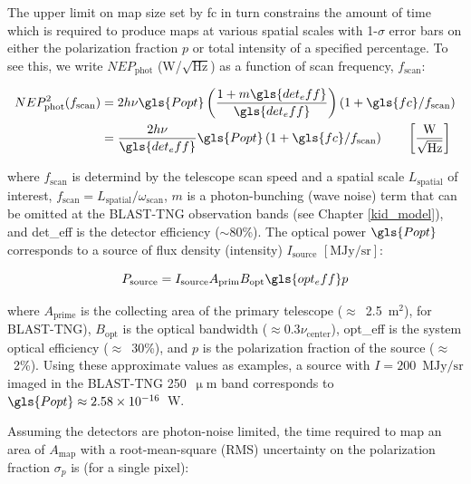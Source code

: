 The upper limit on map size set by \gls{fc} in turn constrains the amount of time which is required to produce maps at various spatial scales with 1-$\sigma$ error bars on either the polarization fraction $p$ or total intensity of a specified percentage. To see this, we write $NEP_{\mathrm{phot}}$ (W/$\sqrt{\mathrm{Hz}}$) as a function of scan frequency, $f_{\mathrm{scan}}$:

\begin{equation}\label{eq:nep flicker}
  \begin{aligned}
  NEP_{\mathrm{phot}}^{2}(f_{\mathrm{scan}}) &= 2 h \nu \gls{Popt} \left( \frac{1 + m \gls{det_eff}}{\gls{det_eff}}\right) \left(1 + \gls{fc}/f_{\mathrm{scan}} \right) \\
          &= \frac{2 h \nu}{ \gls{det_eff} } \gls{Popt} \left( 1 + \gls{fc}/f_{\mathrm{scan}} \right) \qquad \left[ \frac{ \mathrm{W} }{ \sqrt{\mathrm{Hz}} } \right]
  \end{aligned}
\end{equation}

where $f_{\mathrm{scan}}$ is determind by the telescope scan speed and a spatial scale $L_{\mathrm{spatial}}$ of interest, $f_{\mathrm{scan}} = L_{\mathrm{spatial}} / \omega_{\mathrm{scan}}$, $m$ is a photon-bunching (wave noise) term that can be omitted at the BLAST-TNG observation bands (see Chapter \ref{kid_model}), and \gls{det_eff} is the detector efficiency ($\sim$80\%). The optical power $\gls{Popt}$ corresponds to a source of flux density (intensity) $I_{\mathrm{source}}$ $[\mathrm{MJy}/\mathrm{sr}]$:

\begin{equation}
  P_{\mathrm{source}} = I_{\mathrm{source}} A_{\mathrm{prim}} B_{\mathrm{opt}} \gls{opt_eff} p
\end{equation}

where $A_{\mathrm{prime}}$ is the collecting area of the primary telescope ($\approx$~2.5~m$^{2}$), for BLAST-TNG), $B_{\mathrm{opt}}$ is the optical bandwidth ($\approx 0.3 \nu_{\mathrm{center}}$), \gls{opt_eff} is the system optical efficiency ($\approx$~30\%), and $p$ is the polarization fraction of the source ($\approx$~2\%). Using these approximate values as examples, a source with $I = 200$~$\mathrm{MJy}/\mathrm{sr}$ imaged in the BLAST-TNG 250~$\upmu$m band corresponds to $\gls{Popt} \approx 2.58 \times 10^{-16}$~W.

Assuming the detectors are photon-noise limited, the time required to map an area of $A_{\mathrm{map}}$ with a root-mean-square (RMS) uncertainty on the polarization fraction $\sigma_{p}$ is (for a single pixel):

